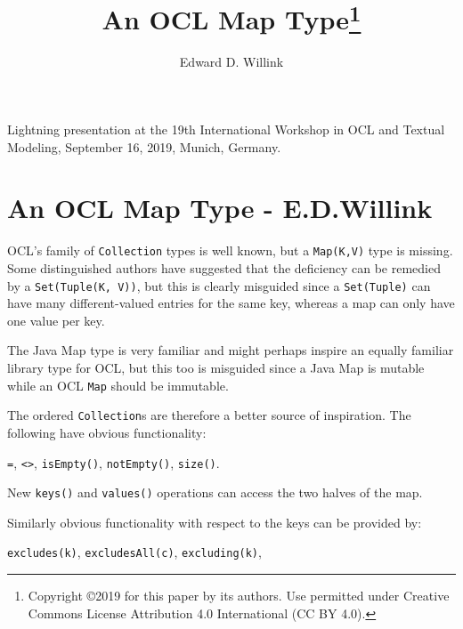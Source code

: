 \documentclass{llncs}
\begin{document}
%
\mainmatter              %
%
\title{An OCL Map Type\thanks{%
      Copyright \copyright 2019 for this paper by its authors.
      Use permitted under Creative Commons License Attribution
      4.0 International (CC BY 4.0).}}
%
%
\author{Edward D. Willink}
%
%
%


\maketitle              %
Lightning presentation at the 19th International Workshop in OCL and Textual Modeling, September 16, 2019, Munich, Germany.
%
\pagebreak
%
\section{An OCL Map Type - E.D.Willink}
OCL's family of \verb$Collection$ types is well known, but a \verb$Map(K,V)$ type is missing. Some distinguished authors have suggested that the deficiency can be remedied by a \verb$Set(Tuple(K, V))$, but this is clearly misguided since a \verb$Set(Tuple)$ can have many different-valued entries for the same key, whereas a map can only have one value per key.

The Java Map type is very familiar and might perhaps inspire an equally familiar library type for OCL, but this too is misguided since a Java Map is mutable while an OCL \verb$Map$ should be immutable.

The ordered \verb$Collection$s are therefore a better source of inspiration. The following have obvious functionality:

\verb$=$, \verb$<>$, \verb$isEmpty()$, \verb$notEmpty()$, \verb$size()$.

New \verb$keys()$ and \verb$values()$ operations can access the two halves of the map. 

Similarly obvious functionality with respect to the keys can be provided  by:

\verb$excludes(k)$, \verb$excludesAll(c)$, \verb$excluding(k)$,
\end{document}
